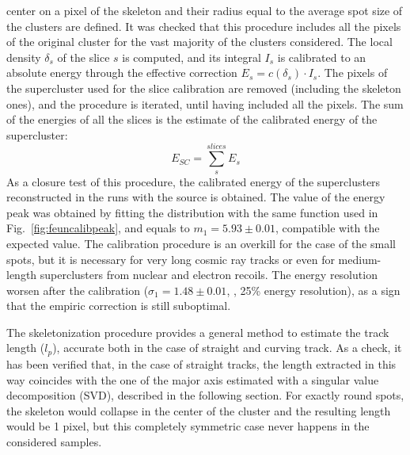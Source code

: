 center on a pixel of the skeleton and their radius equal to the
average spot size of the \fe clusters are defined. It was checked
that this procedure includes all the pixels of the original cluster
for the vast majority of the clusters considered.  The local density
$\delta_s$ of the slice $s$ is computed, and its integral $I_s$ is
calibrated to an absolute energy through the effective correction
$E_s=c(\delta_s)\cdot I_s$. The pixels of the supercluster used for
the slice calibration are removed (including the skeleton ones), and
the procedure is iterated, until having included all the pixels. The
sum of the energies of all the slices is the estimate of the
calibrated energy of the supercluster:
%
\begin{equation}
  \label{eq:ecal}
  E_{SC} = \sum_s^{slices} E_s
\end{equation}
%
As a closure test of this procedure, the calibrated energy of the
superclusters reconstructed in the runs with the \fe source is
obtained.  The value of the energy peak was obtained by fitting the
distribution with the same function used in
Fig.~\ref{fig:feuncalibpeak}, and equals to  $m_1 = 5.93 \pm 0.01$\keV,
compatible with the expected value. The calibration procedure is an
overkill for the case of the small \fe spots, but it is necessary for
very long cosmic ray tracks or even for medium-length superclusters
from nuclear and electron recoils.  The energy resolution worsen after
the calibration ($\sigma_1 = 1.48 \pm 0.01$, \ie, 25\% energy
resolution), as a sign that the empiric correction is still
suboptimal.
%
%

The skeletonization procedure provides a general method to estimate
the track length ($l_p$), accurate both in the case of straight and
curving track. As a check, it has been verified that, in the case of
straight tracks, the length extracted in this way coincides with the
one of the major axis estimated with a singular value decomposition
(SVD), described in the following section. For exactly round spots,
the skeleton would collapse in the center of the cluster and the
resulting length would be 1 pixel, but this completely symmetric case
never happens in the considered samples.
